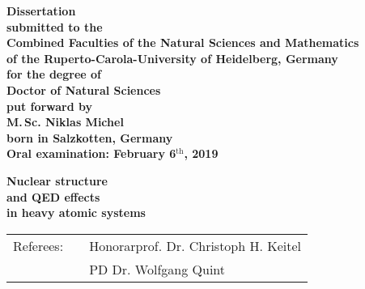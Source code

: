 
\begin{titlepage}
\begin{center}
  \renewcommand{\baselinestretch}{1.50}
  \normalsize\bfseries%
  Dissertation\\
  submitted to the\\
  Combined Faculties of the Natural Sciences and Mathematics\\
  of the Ruperto-Carola-University of Heidelberg, Germany\\
  for the degree of\\
  Doctor of Natural Sciences\\
  \vfill
  put forward by\\
  \vspace{0.5\baselineskip}
  {\Large M.$\,$Sc. Niklas Michel} \\
  \vspace{0.5\baselineskip}
  born in Salzkotten, Germany\\
  Oral examination: February 6$^{\textrm{th}}$, 2019
\end{center}
\end{titlepage}





\begin{titlepage}
\begin{center}
  \renewcommand{\baselinestretch}{1.50}
  \vspace*{1.5\baselineskip}
  \bfseries
  {\Huge Nuclear structure }\\\vspace{0.7\baselineskip}%
  {\Huge and QED effects}\\\vspace{0.7\baselineskip}%
  {\Huge in heavy atomic systems}
  \vfill
  \large%
  \begin{tabular}{lp{0.5cm}l}
  Referees: && Honorarprof. Dr. Christoph H. Keitel\\
  && PD Dr. Wolfgang Quint
  \end{tabular}
\end{center}
\end{titlepage}

\renewcommand{\baselinestretch}{1.00}\normalsize


